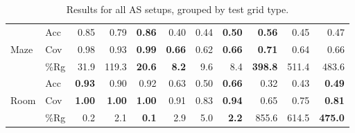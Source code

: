 \documentclass{ecai}
\begin{document}
\begin{table}[bth!]
\begin{tabular}{@{}ll|rrr|rrr|rrr@{}}
\midrule
\multirow{3}{*}{Maze}      & Acc      & 0.85                    & 0.79                    & \textbf{0.86}           & 0.40                    & 0.44                    & \textbf{0.50}           & \textbf{0.56}           & 0.45                    & 0.47                    \\
                           & Cov      & 0.98                    & 0.93                    & \textbf{0.99}           & \textbf{0.66}           & 0.62                    & \textbf{0.66}           & \textbf{0.71}           & 0.64                    & 0.66                    \\
                           & \%Rg     & 31.9                    & 119.3                   & \textbf{20.6}           & \textbf{8.2}            & 9.6                     & 8.4                     & \textbf{398.8}          & 511.4                   & 483.6                   \\
\midrule
\multirow{3}{*}{Room}      & Acc      & \textbf{0.93}           & 0.90                    & 0.92                    & 0.63                    & 0.50                    & \textbf{0.66}           & 0.32                    & 0.43                    & \textbf{0.49}           \\
                           & Cov      & \textbf{1.00}           & \textbf{1.00}           & \textbf{1.00}           & 0.91                    & 0.83                    & \textbf{0.94}           & 0.65                    & 0.75                    & \textbf{0.81}           \\
                           & \%Rg     & 0.2                     & 2.1                     & \textbf{0.1}            & 2.9                     & 5.0                     & \textbf{2.2}            & 855.6                   & 614.5                   & \textbf{475.0}          \\ \bottomrule 
\end{tabular}
\label{tab:by-grid-type}
\caption{Results for all AS setups, grouped by test grid type.}
\end{table}
\end{document}
